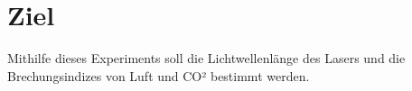 \section{Ziel}

Mithilfe dieses Experiments soll die Lichtwellenlänge des Lasers und die Brechungsindizes von Luft und CO² bestimmt werden.